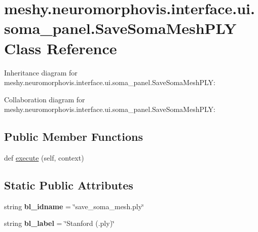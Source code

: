 \hypertarget{classmeshy_1_1neuromorphovis_1_1interface_1_1ui_1_1soma__panel_1_1SaveSomaMeshPLY}{}\section{meshy.\+neuromorphovis.\+interface.\+ui.\+soma\+\_\+panel.\+Save\+Soma\+Mesh\+P\+LY Class Reference}
\label{classmeshy_1_1neuromorphovis_1_1interface_1_1ui_1_1soma__panel_1_1SaveSomaMeshPLY}


Inheritance diagram for meshy.\+neuromorphovis.\+interface.\+ui.\+soma\+\_\+panel.\+Save\+Soma\+Mesh\+P\+LY\+:


Collaboration diagram for meshy.\+neuromorphovis.\+interface.\+ui.\+soma\+\_\+panel.\+Save\+Soma\+Mesh\+P\+LY\+:
\subsection*{Public Member Functions}
\begin{DoxyCompactItemize}
\item 
def \hyperlink{classmeshy_1_1neuromorphovis_1_1interface_1_1ui_1_1soma__panel_1_1SaveSomaMeshPLY_ab7f4e533cc704263df33e5b6f34f803e}{execute} (self, context)
\end{DoxyCompactItemize}
\subsection*{Static Public Attributes}
\begin{DoxyCompactItemize}
\item 
string {\bfseries bl\+\_\+idname} = \char`\"{}save\+\_\+soma\+\_\+mesh.\+ply\char`\"{}\hypertarget{classmeshy_1_1neuromorphovis_1_1interface_1_1ui_1_1soma__panel_1_1SaveSomaMeshPLY_ae2c92fce41f4a6482bdc2692d686d98f}{}\label{classmeshy_1_1neuromorphovis_1_1interface_1_1ui_1_1soma__panel_1_1SaveSomaMeshPLY_ae2c92fce41f4a6482bdc2692d686d98f}

\item 
string {\bfseries bl\+\_\+label} = \char`\"{}Stanford (.ply)\char`\"{}\hypertarget{classmeshy_1_1neuromorphovis_1_1interface_1_1ui_1_1soma__panel_1_1SaveSomaMeshPLY_afe32ac2c985d1582c3833c5be4ab11ac}{}\label{classmeshy_1_1neuromorphovis_1_1interface_1_1ui_1_1soma__panel_1_1SaveSomaMeshPLY_afe32ac2c985d1582c3833c5be4ab11ac}

\end{DoxyCompactItemize}


